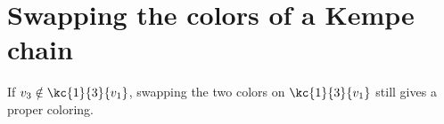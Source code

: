 \section{Swapping the colors of a Kempe chain}\label{app:kempe}
If $v_3\notin\kc{1}{3}{v_1}$, swapping the two colors on $\kc{1}{3}{v_1}$ still gives a proper coloring.
